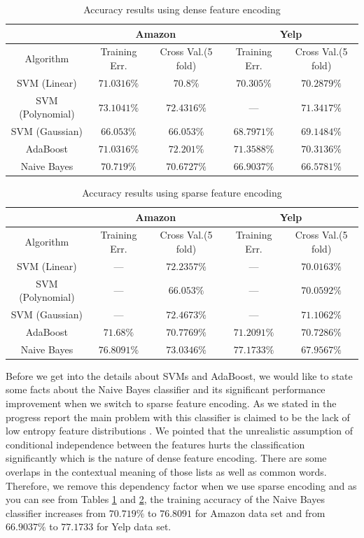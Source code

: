 \documentclass[letterpaper]{article}
\begin{document}
\begin{table}[ht]
\centering
\begin{tabular}{c | c c | c c}
 & \multicolumn{2}{|c|}{Amazon} & \multicolumn{2}{|c}{Yelp} \\
\hline
Algorithm & Training Err. & Cross Val.(5 fold) & Training Err. & Cross Val.(5 fold)\\
\hline
SVM (Linear) 		& $71.0316\%$ & $70.8\%$ & $70.305\%$ & $70.2879\%$\\
SVM (Polynomial) 	& $73.1041\%$ & $72.4316\%$ & --- & $71.3417\%$\\
SVM (Gaussian) 		& $66.053\%$ & $66.053\%$ & $68.7971\%$ & $69.1484\%$\\
AdaBoost 			& $71.0316\%$ & $72.201\%$ & $71.3588\%$ & $70.3136\%$\\ 
Naive Bayes 		& $70.719\%$ & $70.6727\%$ & $66.9037\%$ & $66.5781\%$\\ 
\end{tabular}
\caption{Accuracy results using dense feature encoding}
\label{tab:dense}
\end{table}


\begin{table}[ht]
\centering
\begin{tabular}{c | c c | c c}
 & \multicolumn{2}{|c|}{Amazon} & \multicolumn{2}{|c}{Yelp} \\
\hline
Algorithm & Training Err. & Cross Val.(5 fold) & Training Err. & Cross Val.(5 fold)\\
\hline
SVM (Linear) 		& --- & $72.2357\%$ 		& --- & $70.0163\%$\\
SVM (Polynomial) 	& --- & $66.053\%$ 		& --- & $70.0592\%$\\
SVM (Gaussian) 		& --- & $72.4673\%$ 		& --- & $71.1062\%$\\
AdaBoost 			& $71.68\%$   & $70.7769\%$ & $71.2091\%$ & $70.7286\%$\\ 
Naive Bayes 		& $76.8091\%$ & $73.0346\%$ & $77.1733\%$ & $67.9567\%$\\ 
\end{tabular}
\caption{Accuracy results using sparse feature encoding}
\label{tab:sparse}
\end{table}

Before we get into the details about SVMs and AdaBoost, we would like
to state some facts about the Naive Bayes classifier and its
significant performance improvement when we switch to sparse feature
encoding. As we stated in the progress report the main problem with
this classifier is claimed to be the lack of low entropy feature
distributions \cite{naivebayes}. We pointed that the unrealistic
assumption of conditional independence between the features hurts the classification
significantly which is the nature of dense feature encoding. There are
some overlaps in the contextual meaning of those lists as well as
common words. Therefore, we remove this dependency factor
when we use sparse encoding and as you can see from Tables
\ref{tab:dense} and \ref{tab:sparse}, the training accuracy of
the Naive Bayes classifier increases from $70.719\%$ to $76.8091$ for
Amazon data set and from $66.9037\%$ to $77.1733$ for Yelp data set.
\end{document}
